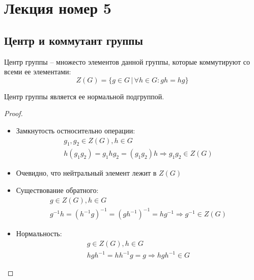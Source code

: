\section{Лекция номер 5}
\subsection{Центр и коммутант группы}
\begin{conj}
    Центр группы -- множесто элементов данной группы, которые коммутируют со всеми ее элементами:
    \[ Z(G) = \{ g \in G \, | \, \forall h \in G : gh = hg \} \]
\end{conj}

\begin{theorem-non}
    Центр группы является ее нормальной подгруппой.
\end{theorem-non}
\begin{proof} \quad \\
    \begin{itemize}
        \item Замкнутость остносительно операции: 
        \begin{gather*}
            g_1, g_2 \in Z(G), h \in G \\
            h(g_1g_2) = g_1hg_2 = (g_1g_2)h \Rightarrow g_1g_2 \in Z(G)
        \end{gather*}
        \item Очевидно, что нейтральный элемент лежит в $Z(G)$
        \item Существование обратного:
        \begin{gather*}
            g \in Z(G), h \in G \\
            g^{-1}h = (h^{-1}g)^{-1} = (gh^{-1})^{-1} = hg^{-1} \Rightarrow g^{-1} \in Z(G)
        \end{gather*}
        \item Нормальность:
        \begin{gather*}
            g \in Z(G), h \in G \\
            hgh^{-1} = hh^{-1}g = g \Rightarrow hgh^{-1} \in G
        \end{gather*}
    \end{itemize}
\end{proof}

